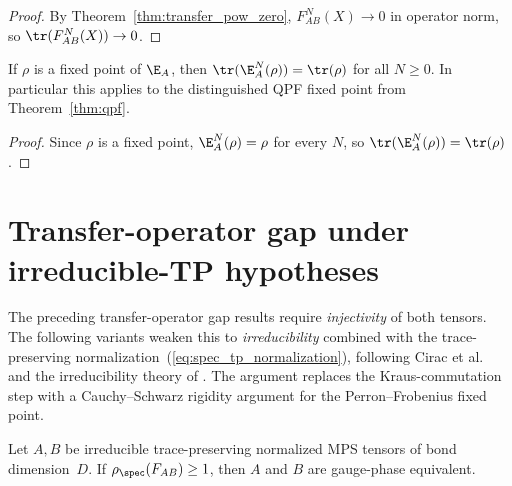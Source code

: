 \begin{proof}\leanok{}
    By Theorem~\ref{thm:transfer_pow_zero}, $F_{AB}^N(X) \to 0$ in operator
    norm, so $\tr(F_{AB}^N(X)) \to 0$.
\end{proof}

\begin{theorem}\label{thm:self_persist}
    \leanok
    If $\rho$ is a fixed point of $\E_A$, then
    $\tr(\E_A^N(\rho)) = \tr(\rho)$ for all $N \ge 0$.
    In particular this applies to the distinguished QPF fixed point from
    Theorem~\ref{thm:qpf}.
\end{theorem}

\begin{proof}\leanok
    Since $\rho$ is a fixed point, $\E_A^N(\rho) = \rho$ for every $N$, so
    $\tr(\E_A^N(\rho)) = \tr(\rho)$.
\end{proof}

\section{Transfer-operator gap under irreducible-TP hypotheses}

The preceding transfer-operator gap results require \emph{injectivity} of both
tensors. The following variants weaken this to \emph{irreducibility}
combined with the trace-preserving normalization~(\ref{eq:spec_tp_normalization}), following Cirac et
al.~\cite{Cirac2017Annals} and the irreducibility theory of
\cite[Section~6.2]{Wolf2012Quantum}. The argument replaces the
Kraus-commutation step with a Cauchy--Schwarz rigidity argument for
the Perron--Frobenius fixed point.

\begin{theorem}\label{thm:modulus_one_gauge_irr_tp}
    \leanok
    Let $A, B$ be irreducible trace-preserving normalized MPS tensors
    of bond dimension~$D$.
    If $\rho_{\spec}(F_{AB}) \ge 1$, then $A$ and $B$ are gauge-phase equivalent.
\end{theorem}

